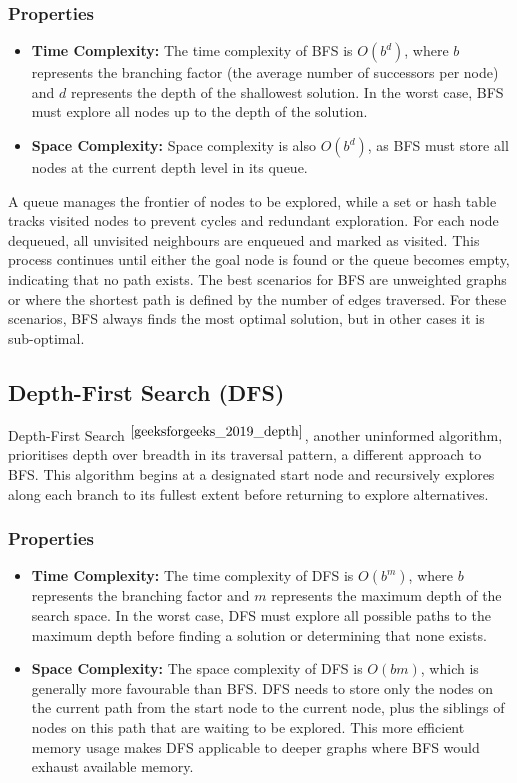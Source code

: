 \subsubsection{Properties}
\begin{itemize}
    \item \textbf{Time Complexity:} The time complexity of BFS is $O(b^d)$, where $b$ represents the branching factor (the average number of successors per node) and $d$ represents the depth of the shallowest solution. In the worst case, BFS must explore all nodes up to the depth of the solution.
    
    \item \textbf{Space Complexity:} Space complexity is also $O(b^d)$, as BFS must store all nodes at the current depth level in its queue.
\end{itemize}

A queue manages the frontier of nodes to be explored, while a set or hash table tracks visited nodes to prevent cycles and redundant exploration. For each node dequeued, all unvisited neighbours are enqueued and marked as visited. This process continues until either the goal node is found or the queue becomes empty, indicating that no path exists. The best scenarios for BFS are unweighted graphs or where the shortest path is defined by the number of edges traversed. For these scenarios, BFS always finds the most optimal solution, but in other cases it is sub-optimal.

\subsection{Depth-First Search (DFS)}
Depth-First Search $^{\cite{geeksforgeeks_2019_depth}}$, another uninformed algorithm, prioritises depth over breadth in its traversal pattern, a different approach to BFS. This algorithm begins at a designated start node and recursively explores along each branch to its fullest extent before returning to explore alternatives.

\subsubsection{Properties}
\begin{itemize}
    
    \item \textbf{Time Complexity:} The time complexity of DFS is $O(b^m)$, where $b$ represents the branching factor and $m$ represents the maximum depth of the search space. In the worst case, DFS must explore all possible paths to the maximum depth before finding a solution or determining that none exists.
    
    \item \textbf{Space Complexity:} The space complexity of DFS is $O(bm)$, which is generally more favourable than BFS. DFS needs to store only the nodes on the current path from the start node to the current node, plus the siblings of nodes on this path that are waiting to be explored. This more efficient memory usage makes DFS applicable to deeper graphs where BFS would exhaust available memory.
\end{itemize}

